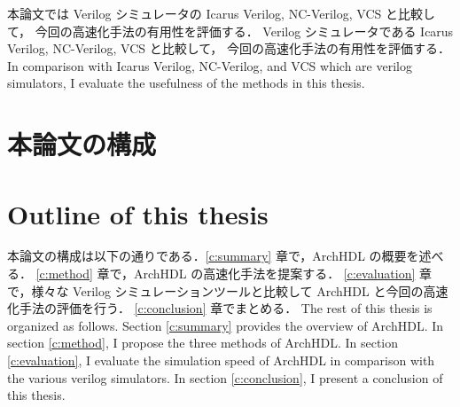 本論文では Verilog シミュレータの Icarus Verilog, NC-Verilog, VCS と比較して，
今回の高速化手法の有用性を評価する．
Verilog シミュレータである Icarus Verilog, NC-Verilog, VCS と比較して，
今回の高速化手法の有用性を評価する．
\fi
In comparison with Icarus Verilog, NC-Verilog, and VCS which are verilog simulators, I evaluate the usefulness of the methods in this thesis.

\section{本論文の構成}
\fi
\section{Outline of this thesis}

本論文の構成は以下の通りである．\ref{c:summary} 章で，ArchHDL の概要を述べる．
\ref{c:method} 章で，ArchHDL の高速化手法を提案する．
\ref{c:evaluation} 章で，様々な Verilog シミュレーションツールと比較して ArchHDL と今回の高速化手法の評価を行う．
\ref{c:conclusion} 章でまとめる．
\fi
The rest of this thesis is organized as follows.
Section \ref{c:summary} provides the overview of ArchHDL.
In section \ref{c:method}, I propose the three methods of ArchHDL.
In section \ref{c:evaluation}, I evaluate the simulation speed of ArchHDL in comparison with the various verilog simulators.
In section \ref{c:conclusion}, I present a conclusion of this thesis.
